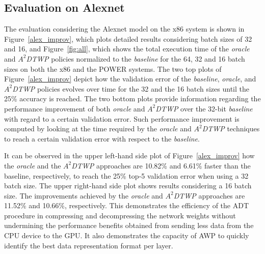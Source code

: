 \subsection{Evaluation on Alexnet}
\label{sec:alexnet}
The evaluation considering the Alexnet model on the x86 system is shown in  
Figure~\ref{alex_improv}, which plots detailed results considering batch sizes of 
32 and 16, and Figure~\ref{fig:all}, which shows the total execution time of the 
\textit{oracle} and \textit{$A^2$DTWP} policies normalized to the \textit{baseline} 
for the 64, 32 and 16 batch sizes on both the x86 and the POWER systems.
The two top plots of Figure~\ref{alex_improv} depict how the validation error of the 
\textit{baseline}, \textit{oracle}, and \textit{$A^2$DTWP} policies evolves 
over time for the 32 and the 16 batch sizes until the 25\% accuracy is reached.
The two bottom plots provide information regarding the performance 
improvement of both \textit{oracle} and \textit{$A^2$DTWP} over the 
32-bit \textit{baseline} with regard to a certain validation error. 
Such performance improvement is computed by looking at the time required by the 
\textit{oracle} and \textit{$A^2$DTWP} techniques to reach a certain validation error with respect to the \textit{baseline}.

It can be observed in the upper left-hand side plot of Figure~\ref{alex_improv} how 
the \textit{oracle} and the \textit{$A^2$DTWP} approaches are 10.82\% and 6.61\% faster than the baseline, respectively, to reach the 25\% top-5 validation error when using a 32 batch size.
The upper right-hand side plot shows results considering a 16 batch size. 
The improvements achieved by the 
\textit{oracle} and \textit{$A^2$DTWP} approaches are 11.52\% and 10.66\%, respectively.
This demonstrates 
the efficiency of the ADT procedure in compressing and decompressing the network weights without undermining the performance benefits obtained from sending less data
from the CPU device to the GPU.
It also demonstrates the capacity of AWP to quickly identify the best data representation format per layer.

